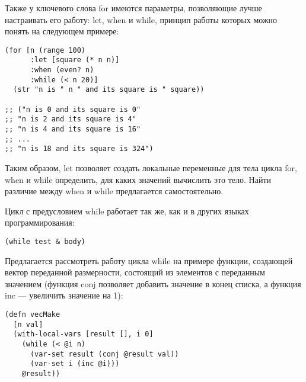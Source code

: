 Также у ключевого слова for  имеются параметры, позволяющие лучше настраивать его работу: let, when и while, принцип работы которых можно понять на следующем примере:

\begin{center}
	\captionsetup{justification=raggedright,singlelinecheck=off}
	\begin{lstlisting}[label=lst:for-example-3,caption=Пример использования for с let, when и while]
(for [n (range 100)                                        
      :let [square (* n n)]                                
      :when (even? n)                                      
      :while (< n 20)]                                  
  (str "n is " n " and its square is " square))           

;; ("n is 0 and its square is 0"
;; "n is 2 and its square is 4"
;; "n is 4 and its square is 16"
;; ...
;; "n is 18 and its square is 324")
	\end{lstlisting}
\end{center}

Таким образом, let  позволяет создать локальные переменные для тела цикла for, when и while определить, для каких значений вычислить это тело. Найти различие между when и while предлагается самостоятельно.


Цикл с предусловием while работает так же, как и в других языках программирования: 

\begin{center}
	\captionsetup{justification=raggedright,singlelinecheck=off}
	\begin{lstlisting}[label=lst:while-example-3,caption=Синтаксис использования while]
(while test & body)
	\end{lstlisting}
\end{center}

Предлагается рассмотреть работу цикла while на примере функции, создающей вектор переданной размерности, состоящий из элементов с переданным значением (функция conj позволяет добавить значение в конец списка, а функция inc --- увеличить значение на 1):

\begin{center}
	\captionsetup{justification=raggedright,singlelinecheck=off}
	\begin{lstlisting}[label=lst:while-example,caption=Пример использования while]
(defn vecMake
  [n val]
  (with-local-vars [result [], i 0]
	(while (< @i n)
	  (var-set result (conj @result val))
	  (var-set i (inc @i)))
	@result))
	\end{lstlisting}
\end{center}


